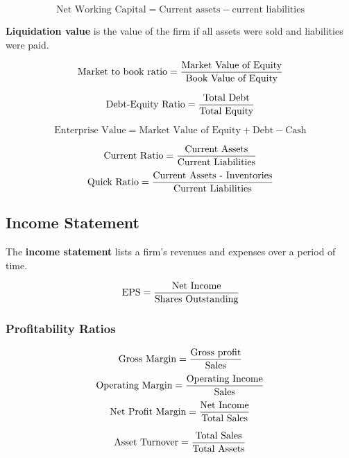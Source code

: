 \documentclass[english, 12pt]{article}
\begin{document}
\begin{rto}
\[\text{Net Working Capital} = \text{Current assets} - \text{current liabilities}\]
\end{rto}

\begin{defn}
\textbf{Liquidation value} is the value of the firm if all assets were sold and liabilities were paid.
\end{defn}

\begin{rto}
\[ \text{Market to book ratio} = \frac{\text{Market Value of Equity}}{\text{Book Value of Equity}}\]
\end{rto}

\begin{rto}
\[\text{Debt-Equity Ratio} = \frac{\text{Total Debt}}{\text{Total Equity}}\]
\end{rto}

\begin{rto}
\[ \text{Enterprise Value} = \text{Market Value of Equity} + \text{Debt} - \text{Cash}\]
\end{rto}

\begin{rto}
\[\text{Current Ratio} = \frac{\text{Current Assets}}{\text{Current Liabilities}}\]
\[\text{Quick Ratio} = \frac{\text{Current Assets - Inventories}}{\text{Current Liabilities}}\]
\end{rto}

\subsection{Income Statement}
\begin{defn}
The \textbf{income statement} lists a firm's revenues and expenses over a period of time.
\end{defn}

\begin{rto}
\[ \text{EPS} = \frac{\text{Net Income}}{\text{Shares Outstanding}}\]
\end{rto}

\subsubsection*{Profitability Ratios}
\[ \text{Gross Margin} = \frac{\text{Gross profit}}{\text{Sales}}\]
\[ \text{Operating Margin} =  \frac{\text{Operating Income}}{\text{Sales}}\]
\[ \text{Net Profit Margin} = \frac{\text{Net Income}}{\text{Total Sales}}\]

\begin{rto}
\[\text{Asset Turnover} = \frac{\text{Total Sales}}{\text{Total Assets}}\]
\end{rto}
\end{document}
